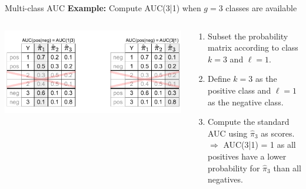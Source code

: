 \begin{vbframe}{Multi-class AUC}
\textbf{Example:} Compute AUC(3|1) when $g=3$ classes are available
\begin{columns}[T]
\begin{column}{0.3\textwidth}
\centerline{\includegraphics[trim = 250 15 00 10, clip, width=\textwidth]{figure_man/multiclass-auc.pdf}}
\end{column}
\begin{column}{0.7\textwidth}
\begin{enumerate}
\small
\item Subset the probability matrix according to class $k=3$ and $\ell = 1$.
\item Define $k=3$ as the positive class and $\ell = 1$ as the negative class.
\item Compute the standard AUC using $\hat \pi_3$ as scores.\\ %
$\Rightarrow$ AUC(3|1) = 1 as all positives have a lower probability for $\hat \pi_3$ than all negatives.
\end{enumerate}
\end{column}
\end{columns}

\end{vbframe}



